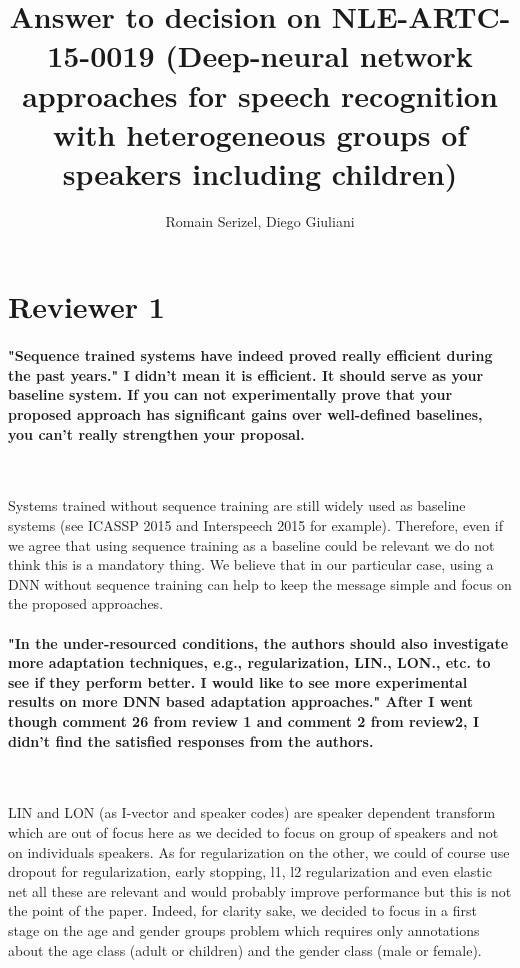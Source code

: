 \documentclass[]{article}
\title{Answer to decision on NLE-ARTC-15-0019 (Deep-neural network approaches for speech recognition with heterogeneous groups of speakers including children)}
\author{Romain Serizel, Diego Giuliani}
\begin{document}
\maketitle


\section{Reviewer 1}
\paragraph{"Sequence trained systems have indeed proved really efficient during the past years." I didn't mean it is efficient. It should serve as your baseline system. If you can not experimentally prove that your proposed approach has significant gains over well-defined baselines, you can't really strengthen your proposal.}

~

Systems trained without sequence training are still widely used as baseline systems (see ICASSP 2015 and Interspeech 2015 for example). Therefore, even if we agree that using sequence training as a baseline could be relevant we do not think this is a mandatory thing. We believe that in our particular case, using a DNN without sequence training can help to keep the message simple and focus on the proposed approaches.
\paragraph{"In the under-resourced conditions, the authors should also investigate more adaptation techniques, e.g., regularization, LIN., LON., etc. to see if they perform better. I would like to see more experimental results on more DNN based adaptation approaches." After I went though comment 26 from review 1 and comment 2 from review2, I didn't find the satisfied responses from the authors.}

~

LIN and LON (as I-vector and speaker codes) are speaker dependent transform which are out of focus here as we decided to focus on group of speakers and not on individuals speakers. As for regularization on the other, we could of course use dropout for regularization, early stopping, l1, l2 regularization and even elastic net all these are relevant and would probably improve performance but this is not the point of the paper. Indeed, for clarity sake, we decided to focus in a first stage on the age and gender groups problem which requires only annotations about the age class (adult or children) and the gender class (male or female). 
\end{document}
